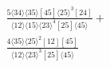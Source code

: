\documentclass[varwidth, border=5pt]{standalone}
\begin{document}
\begin{my}
$\begin{gathered}
\scriptscriptstyle\frac{5⟨34⟩⟨35⟩[45]⟨25⟩^3[24]}{⟨12⟩⟨15⟩⟨23⟩^4[25]⟨45⟩}+\\
\scriptscriptstyle\frac{4⟨35⟩⟨25⟩^2[12][45]}{⟨12⟩⟨23⟩^3[25]⟨45⟩}\phantom{+}
\end{gathered}$
\end{my}
\end{document}
